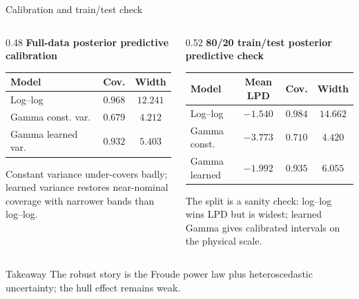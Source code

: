 \documentclass[11pt,aspectratio=169]{beamer}
\begin{document}
\begin{frame}{Calibration and train/test check}
	\small
	\begin{columns}[T]
		\begin{column}{0.48\textwidth}
			\textbf{Full-data posterior predictive calibration}
			\vspace{0.3em}
			\scriptsize
			\begin{tabular}{lcc}
				\toprule
				\textbf{Model} & \textbf{Cov.} & \textbf{Width} \\
				\midrule
				Log--log & $0.968$ & $12.241$ \\
				Gamma const. var. & $0.679$ & $4.212$ \\
				Gamma learned var. & $0.932$ & $5.403$ \\
				\bottomrule
			\end{tabular}
			\vspace{0.7em}

			\normalsize Constant variance under-covers badly; learned variance restores near-nominal coverage with narrower bands than log--log.
		\end{column}
		\begin{column}{0.52\textwidth}
			\textbf{80/20 train/test posterior predictive check}
			\vspace{0.3em}
			\scriptsize
			\begin{tabular}{lccc}
				\toprule
				\textbf{Model} & \textbf{Mean LPD} & \textbf{Cov.} & \textbf{Width} \\
				\midrule
				Log--log & $-1.540$ & $0.984$ & $14.662$ \\
				Gamma const. & $-3.773$ & $0.710$ & $4.420$ \\
				Gamma learned & $-1.992$ & $0.935$ & $6.055$ \\
				\bottomrule
			\end{tabular}
			\vspace{0.7em}

			\normalsize The split is a sanity check: log--log wins LPD but is widest; learned Gamma gives calibrated intervals on the physical scale.
		\end{column}
	\end{columns}
	\vspace{0.4em}
	\begin{block}{Takeaway}
		The robust story is the Froude power law plus heteroscedastic uncertainty; the hull effect remains weak.
	\end{block}
\end{frame}
\end{document}
